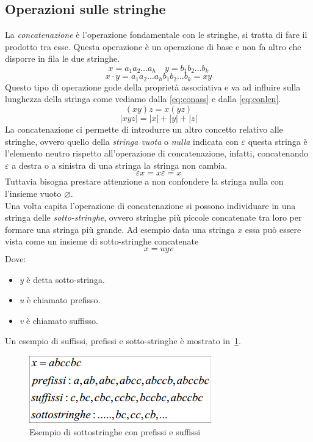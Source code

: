 \subsection{Operazioni sulle stringhe}
La \emph{concatenazione} è l'operazione fondamentale con le stringhe, si tratta di fare il prodotto tra esse. Questa operazione è un operazione di base e non fa altro che disporre in fila le due stringhe.
$$x = a_1a_2\dots a_h \quad y = b_1b_2\dots b_k$$
$$x\cdot y = a_1a_2\dots a_hb_1b_2\dots b_k = xy$$
Questo tipo di operazione gode della proprietà associativa e va ad influire sulla lunghezza della stringa come vediamo dalla \ref{eq:conass} e dalla \ref{eq:conlen}.
\begin{equation}\label{eq:conass}
	(xy)z = x(yz)
\end{equation}
\begin{equation}\label{eq:conlen}
	|xyz| = |x| + |y| + |z|
\end{equation}
La concatenazione ci permette di introdurre un altro concetto relativo alle stringhe, ovvero quello della \emph{stringa vuota} o \emph{nulla} indicata con $ \varepsilon $ questa stringa è l'elemento neutro rispetto all'operazione di concatenazione, infatti, concatenando $ \varepsilon $ a destra o a sinistra di una stringa la stringa non cambia.
$$\varepsilon x = x\varepsilon = x$$
Tuttavia bisogna prestare attenzione a non confondere la stringa nulla con l'insieme vuoto $\varnothing$.\\
Una volta capita l'operazione di concatenazione si possono individuare in una stringa delle \emph{sotto-stringhe}, ovvero stringhe più piccole concatenate tra loro per formare una stringa più grande.
Ad esempio data una stringa $x$ essa può essere vista come un insieme di sotto-stringhe concatenate
$$x = uyv$$
Dove:
\begin{itemize}
	\item \emph{y} è detta sotto-stringa.
	\item \emph{u} è chiamato prefisso.
	\item \emph{v} è chiamato suffisso.
\end{itemize}
Un esempio di suffissi, prefissi e sotto-stringhe è mostrato in \figurename\,\ref{fig:sufpref}.
\begin{figure}
	\centering
	\includegraphics[width=0.5\linewidth]{img/substr.png}
	\caption{Esempio di sottostringhe con prefissi e suffissi}\label{fig:sufpref}
\end{figure}

